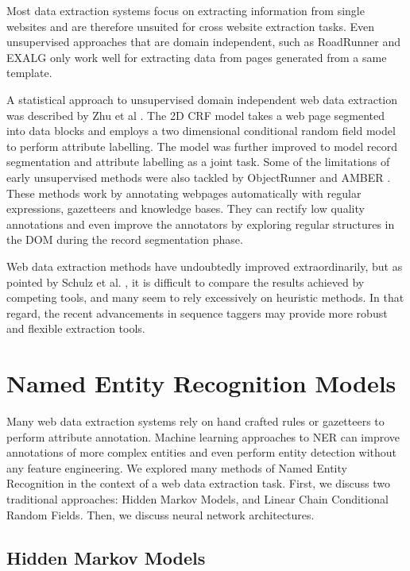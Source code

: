 \documentclass{nle}
\begin{document}
Most data extraction systems focus on extracting information from single websites
and are therefore unsuited for cross website extraction tasks. Even unsupervised
approaches that are domain independent, such as RoadRunner \cite{Crescenzi2001} 
and EXALG \cite{Arasu2003} only work well for extracting data from pages generated 
from a same template. 

A statistical approach to unsupervised domain 
independent web data extraction was described by Zhu et al \cite{Zhu2005}. The 2D CRF 
model takes a web page segmented into data blocks and employs a two dimensional conditional 
random field model to perform attribute labelling. The model was further improved
\cite{Zhu2006} to model record segmentation and attribute labelling as a joint task.
Some of the limitations of early unsupervised methods 
were also tackled by ObjectRunner \cite{Abdessalem2010} and AMBER \cite{Furche2012}. 
These methods work by annotating webpages automatically with regular expressions, gazetteers and 
knowledge bases. They can rectify low quality annotations and even improve the annotators
by exploring regular structures in the DOM during the record segmentation phase.

Web data extraction methods have undoubtedly improved extraordinarily, but
as pointed by Schulz et al. \cite{Schulz2016}, it is difficult to compare the results 
achieved by competing tools, and many seem to rely excessively on heuristic methods.
In that regard, the recent advancements in sequence taggers may provide more robust and
flexible extraction tools.

\section{Named Entity Recognition Models}

Many web data extraction systems rely on hand crafted rules or gazetteers to perform
attribute annotation. Machine learning approaches to NER can improve annotations of 
more complex entities and even perform entity detection without any feature
engineering. We explored many methods of Named Entity Recognition
in the context of a web data extraction task. First, we discuss two traditional 
approaches: Hidden Markov Models, and Linear Chain Conditional Random Fields. Then,
we discuss neural network architectures.

\subsection{Hidden Markov Models}
\end{document}
